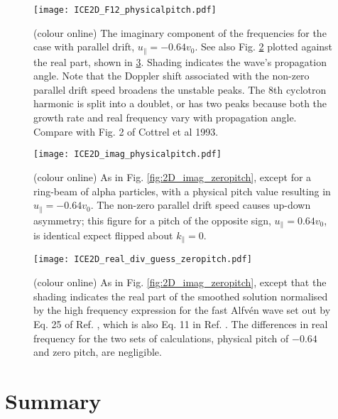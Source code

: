 \documentclass[12pt]{iopart}
\begin{document}
\begin{figure}[ht!]
    \centering
\texttt{[image: ICE2D\_F12\_physicalpitch.pdf]}
    \caption{(colour online) The imaginary component of the frequencies for the case with parallel drift, $u_{\parallel} = -0.64 v_0$. See also Fig. \ref{fig:2D_imag_physicalpitch} plotted against the real part, shown in \ref{fig:2D_real_zeropitch}. Shading indicates the wave's propagation angle. Note that the Doppler shift associated with the non-zero parallel drift speed broadens the unstable peaks. The 8th cyclotron harmonic is split into a doublet, or has two peaks because both the growth rate and real frequency vary with propagation angle. Compare with Fig. 2 of Cottrel et al 1993.}
    \label{fig:2D_F12_physicalpitch}
\end{figure}

\begin{figure}[ht!]
    \centering
\texttt{[image: ICE2D\_imag\_physicalpitch.pdf]}
    \caption{(colour online) As in Fig. \ref{fig:2D_imag_zeropitch}, except for a ring-beam of alpha particles, with a physical pitch value resulting in $u_{\parallel} = -0.64 v_0$. The non-zero parallel drift speed causes up-down asymmetry; this figure for a pitch of the opposite sign, $u_{\parallel} = 0.64 v_0$, is identical expect flipped about $k_\parallel=0$.}
    \label{fig:2D_imag_physicalpitch}
\end{figure}


\begin{figure}[ht!]
    \centering
\texttt{[image: ICE2D\_real\_div\_guess\_zeropitch.pdf]}
    \caption{(colour online) As in Fig. \ref{fig:2D_imag_zeropitch}, except that the shading indicates the real part of the smoothed solution normalised by the high frequency expression for the fast Alfv{\'e}n wave set out by Eq. 25 of Ref. \cite{Dendy1994}, which is also Eq. 11 in Ref. \cite{McClements1996}. The differences in real frequency for the two sets of calculations, physical pitch of $-0.64$ and zero pitch, are negligible.}
    \label{fig:2D_real_zeropitch}
\end{figure}

\section{Summary}
\end{document}
